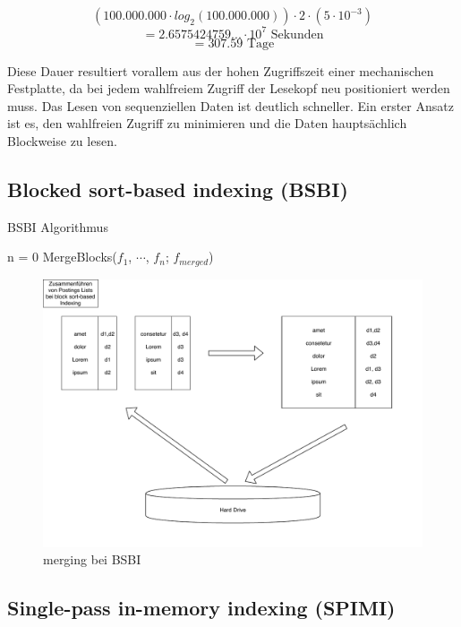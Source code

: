\[(100.000.000 \cdot log_2 (100.000.000)) \cdot 2 \cdot (5 \cdot 10^{-3}) \]
\[ = 2.6575424759... \cdot 10^7 \text{ Sekunden}\]
\[ = 307.59 \text{ Tage} \]

Diese Dauer resultiert vorallem aus der hohen Zugriffszeit einer mechanischen Festplatte, da bei jedem wahlfreiem Zugriff der Lesekopf neu positioniert werden muss. Das Lesen von sequenziellen Daten ist deutlich schneller. Ein erster Ansatz ist es, den wahlfreien Zugriff zu minimieren und die Daten hauptsächlich Blockweise zu lesen.
\par

\subsection{Blocked sort-based indexing (BSBI)}

\begin{algorithm}
\caption{BSBI Algorithmus}
 n = 0\;
  MergeBlocks($f_1$, $\cdots$, $f_n$; $f_{merged}$)\;
\end{algorithm}


\begin{figure}
  \includegraphics[width=\textwidth]{pdf/BSI_merging.pdf}
  \caption{merging bei BSBI}
\end{figure}

\subsection{Single-pass in-memory indexing (SPIMI)}

